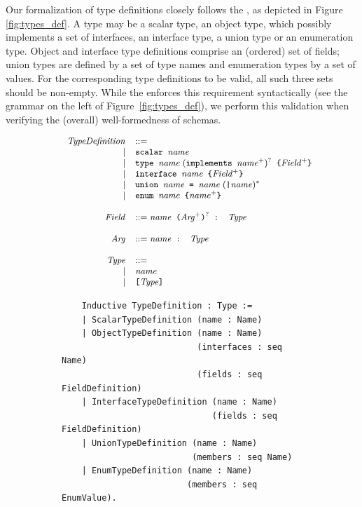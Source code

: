 Our formalization of type definitions closely follows the \spec, as
depicted in Figure~ \ref{fig:types_def}. A type may be a scalar type,
an object type, which possibly implements a set of interfaces, an
interface type, a union type or an enumeration type. Object and
interface type definitions comprise an (ordered) set of fields; union
types are defined by a set of type names and enumeration types by a
set of values. For the corresponding type definitions to be valid, all
such three sets should be non-empty. While the \spec enforces this
requirement syntactically (see the grammar on the left of
Figure~\ref{fig:types_def}), we perform this validation when verifying
the (overall) well-formedness of schemas.     
%
\setlength{\grammarparsep}{10pt plus 1pt minus 1pt} %
\begin{figure}[h]
    \centering
    \begin{subfigure}{.5\textwidth}
    \begin{displaymath}
    \small
	\begin{array}{rl}
	\mathit{TypeDefinition} & ::= \\
	 | & \texttt{scalar } \mathit{name}  \\
	 | & \texttt{type } \mathit{name}\; (\texttt{implements } \mathit{name}^{+})^{?} \texttt{ \{} \mathit{Field}^{+} \texttt{\}}\\
	 | & \texttt{interface } \mathit{name} \texttt{ \{} \mathit{Field}^{+} \texttt{\}}\\
	 | & \texttt{union } \mathit{name} \texttt{ = } \mathit{name}\; (\texttt{|} \mathit{name})^{*}\\
	 | & \texttt{enum } \mathit{name} \texttt{ \{} \mathit{name}^{+} \texttt{\}} \\
	& \\
	\mathit{Field} & ::= \mathit{name} \texttt{ (} \mathit{Arg^{+}} \texttt{)}^{?} \texttt{ : } \mathit{Type}\\
	& \\
    \mathit{Arg} & ::= \mathit{name} \texttt{ : } \mathit{Type}\\
	& \\
    \mathit{Type} & ::=\\ 
     | & \mathit{name} \\
 	 | &  \texttt{[}  \mathit{Type} \texttt{]}
	\end{array}
	\end{displaymath}
	
    
    \end{subfigure}%
    \begin{subfigure}{.5\textwidth}
    \begin{verbatim}
    Inductive TypeDefinition : Type :=
    | ScalarTypeDefinition (name : Name)
    | ObjectTypeDefinition (name : Name)
                           (interfaces : seq Name)
                           (fields : seq FieldDefinition)
    | InterfaceTypeDefinition (name : Name)
                              (fields : seq FieldDefinition)
    | UnionTypeDefinition (name : Name)
                          (members : seq Name)
    | EnumTypeDefinition (name : Name)
                         (members : seq EnumValue).


\end{verbatim}
\end{subfigure}
\end{figure}
